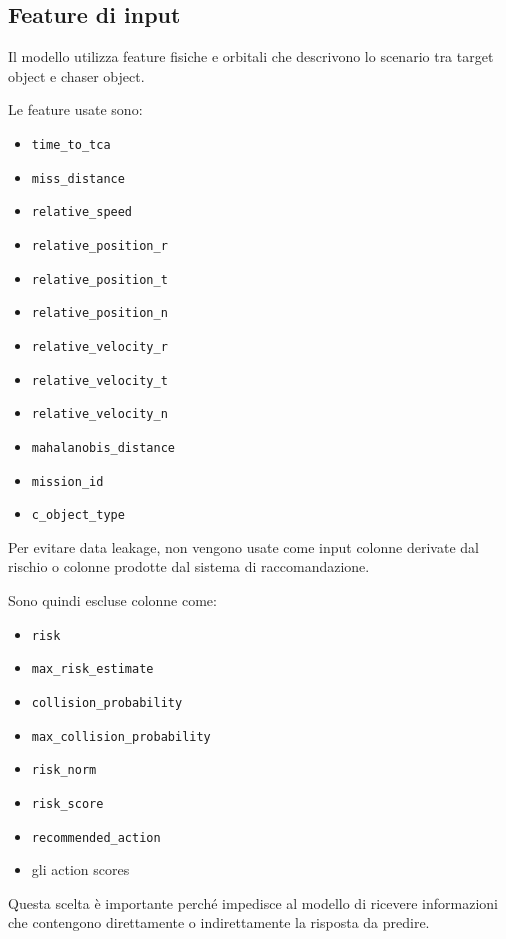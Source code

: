 \documentclass[12pt,a4paper]{article}
\begin{document}
\subsection{Feature di input}

Il modello utilizza feature fisiche e orbitali che descrivono lo scenario tra target object e chaser object.

Le feature usate sono:

\begin{itemize}
    \item \texttt{time\_to\_tca}
    \item \texttt{miss\_distance}
    \item \texttt{relative\_speed}
    \item \texttt{relative\_position\_r}
    \item \texttt{relative\_position\_t}
    \item \texttt{relative\_position\_n}
    \item \texttt{relative\_velocity\_r}
    \item \texttt{relative\_velocity\_t}
    \item \texttt{relative\_velocity\_n}
    \item \texttt{mahalanobis\_distance}
    \item \texttt{mission\_id}
    \item \texttt{c\_object\_type}
\end{itemize}

Per evitare data leakage, non vengono usate come input colonne derivate dal rischio o colonne prodotte dal sistema di raccomandazione.

Sono quindi escluse colonne come:

\begin{itemize}
    \item \texttt{risk}
    \item \texttt{max\_risk\_estimate}
    \item \texttt{collision\_probability}
    \item \texttt{max\_collision\_probability}
    \item \texttt{risk\_norm}
    \item \texttt{risk\_score}
    \item \texttt{recommended\_action}
    \item gli action scores
\end{itemize}

Questa scelta è importante perché impedisce al modello di ricevere informazioni che contengono direttamente o indirettamente la risposta da predire.
\end{document}
